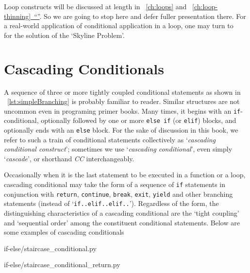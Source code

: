 \documentclass[oneside,11pt]{book}
\theoremstyle{definition}
\theoremstyle{remark}
\newcommand{\code}[1]{\mbox{\lstinline{#1}}}
\newcommand{\python}{Python }
\newcommand*{\fullref}[1]{\hyperref[{#1}]{\mbox{\autoref*{#1}~}``\nameref*{#1}''}}
\begin{document}
Loop constructs will be discussed at length in ~\autoref{ch:loops} and ~\fullref{ch:loop-thinning}.
So we are going to stop here and defer fuller presentation there.
For a real-world application of conditional application in a loop, one may turn to
~\pageref{lst:silhouette-skyline} for the solution of the `Skyline Problem'.





\clearpage{}
    \clearpage{}

\chapter{Cascading Conditionals}\label{ch:conditional-cascade}

A sequence of three or more tightly coupled conditional statements as shown in
~\autoref{lst:simpleBranching} is probably familiar to reader.
Similar structures are not uncommon even in programing primer books.
Many times, it begins with an \code{if}-conditional, optionally followed by one or more
\code{else if} (or \code{elif}) blocks, and optionally ends with an \code{else} block.
For the sake of discussion in this book, we refer to such a train of conditional statements
collectively as `\emph{cascading conditional construct}';
sometimes we use `\emph{cascading conditional}', even simply `\emph{cascade}',
or shorthand \emph{CC}  interchangeably.

Occasionally when it is the last statement to be executed in a function
or a loop, cascading conditional may take the form of a sequence of \code{if} statements
in conjunction with \code{return}, \code{continue},
\code{break}, \code{exit}, \code{yield} and other branching statements (instead
of `\code{if..elif..elif..}').
Regardless of the form, the distinguishing characteristics of a cascading conditional are
the `tight coupling' and `sequential order' among the constituent conditional statements.
Below are some examples of cascading conditionals
\begin{clisting}[h]
    \begin{minipage}[t]{.4\textwidth}
        
        {if-else/staircase_conditional.py}
    \end{minipage}\hfill
    \begin{minipage}[t]{.4\textwidth}
        
        {if-else/staircase_conditional_return.py}
    \end{minipage}
\end{clisting}
\end{document}
